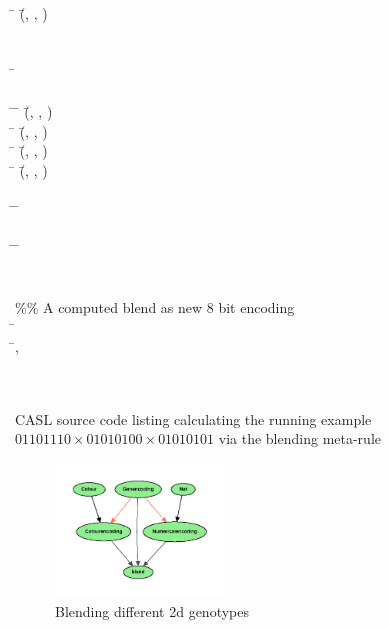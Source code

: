 \documentclass{AISB2008}
\begin{document}
\begin{listing}[H]
{\begin{hetcasl}
\> \Ax{\bullet} \= (\=, , ) \Ax{=} \\
\\
\\
\SPEC \= \Ax{=}\\
\> \\
\THEN \=\Ax{\bullet} \= (\=, , ) \Ax{=} \\
\> \Ax{\bullet} \= (\=, , ) \Ax{=} \\
\> \Ax{\bullet} \= (\=, , ) \Ax{=} \\
\> \Ax{\bullet} \= (\=, , ) \Ax{=} \\
\\
\VIEW \= \Ax{:} \=  \\
\\
\VIEW \= \Ax{:} \=  \\
\\
\\
\%\% A computed blend as new 8 bit encoding\\
\SPEC \= \Ax{=}\\
\>  \=, \\
\AND {}\\
\AND {}\\
\end{hetcasl}
}
\caption{CASL source code listing calculating the running example $01101110\times 01010100\times 01010101$ via the blending meta-rule\label{CASL-listing}}
\end{listing}

\newpage
\begin{figure}[H]
\includegraphics[width=0.4\textwidth]{2dblend.pdf}
\caption{Blending different 2d genotypes}
\label{fig:2dblend}
\end{figure}
\end{document}

